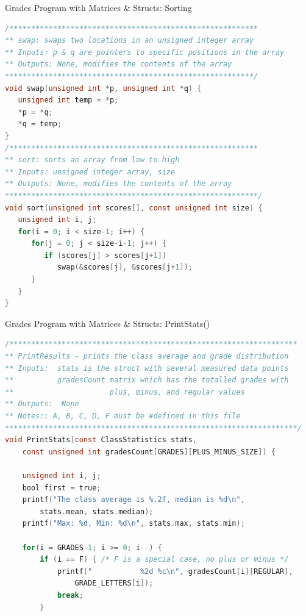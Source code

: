 \documentclass[graphics]{beamer}
\begin{document}
\begin{frame}[fragile]{Grades Program with Matrices \& Structs: Sorting}
    \begin{lstlisting}[language=C,basicstyle=\scriptsize,keywordstyle=\color{blue},commentstyle=\color{green},showstringspaces=false,stringstyle=\color{red}]
/*********************************************************
** swap: swaps two locations in an unsigned integer array
** Inputs: p & q are pointers to specific positions in the array
** Outputs: None, modifies the contents of the array
*********************************************************/
void swap(unsigned int *p, unsigned int *q) {
   unsigned int temp = *p;
   *p = *q;
   *q = temp;
}
/*********************************************************
** sort: sorts an array from low to high
** Inputs: unsigned integer array, size
** Outputs: None, modifies the contents of the array
**********************************************************/
void sort(unsigned int scores[], const unsigned int size) { 
   unsigned int i, j;
   for(i = 0; i < size-1; i++) {
      for(j = 0; j < size-i-1; j++) {
         if (scores[j] > scores[j+1])
            swap(&scores[j], &scores[j+1]);
      }
   }
}
    \end{lstlisting}
\end{frame}

\begin{frame}[fragile]{Grades Program with Matrices \& Structs: PrintStats()}
    \begin{lstlisting}[language=C,basicstyle=\scriptsize,keywordstyle=\color{blue},commentstyle=\color{green},showstringspaces=false,stringstyle=\color{red}]
/******************************************************************
** PrintResults - prints the class average and grade distribution
** Inputs:  stats is the struct with several measured data points
**          gradesCount matrix which has the totalled grades with
**                      plus, minus, and regular values
** Outputs:  None
** Notes:: A, B, C, D, F must be #defined in this file
*******************************************************************/
void PrintStats(const ClassStatistics stats,
    const unsigned int gradesCount[GRADES][PLUS_MINUS_SIZE]) {
    
    unsigned int i, j;
    bool first = true;
    printf("The class average is %.2f, median is %d\n",
        stats.mean, stats.median);
    printf("Max: %d, Min: %d\n", stats.max, stats.min);

    for(i = GRADES-1; i >= 0; i--) {
        if (i == F) { /* F is a special case, no plus or minus */
            printf("           %2d %c\n", gradesCount[i][REGULAR],
                GRADE_LETTERS[i]);
            break;
        }
        
    \end{lstlisting}
\end{frame}
\end{document}
